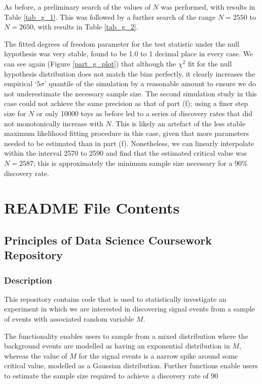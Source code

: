 \documentclass[12pt]{article}
\begin{document}
As before, a preliminary search of the values of $N$ was performed, with results in Table \ref{tab_g_1}.
This was followed by a further search of the range $N=2550$ to $N=2650$, with results in Table \ref{tab_g_2}.

The fitted degrees of freedom parameter for the test statistic under the null hypothesis was very stable, found to be 1.0 to 1 decimal place in every case.
We can see again (Figure \ref{part_g_plot}) that although the $\chi^2$ fit for the null hypothesis distribution does not match the bins perfectly, it clearly increases the empirical `$5\sigma$' quantile of the simulation by a reasonable amount to ensure we do not underestimate the necessary sample size.
The second simulation study in this case could not achieve the same precision as that of part (f); using a finer step size for $N$ or only 10000 toys as before led to a series of discovery rates that did not monotonically increase with $N$.
This is likely an artefact of the less stable maximum likelihood fitting procedure in this case, given that more parameters needed to be estimated than in part (f).
Nonetheless, we can linearly interpolate within the interval 2570 to 2590 and find that the estimated critical value was $N=2587$; this is approximately the minimum sample size necessary for a 90\% discovery rate.





\newpage

\appendix
\section*{README File Contents}

\subsection*{Principles of Data Science Coursework Repository}

\subsubsection*{Description}
This repository contains code that is used to statistically investigate an experiment in which we are interested in discovering signal events from a sample of events with associated random variable $M$.

The functionality enables users to sample from a mixed distribution where the background events are modelled as having an exponential distribution in $M$, whereas the value of $M$ for the signal events is a narrow spike around some critical value, modelled as a Gaussian distribution. Further functions enable users to estimate the sample size required to achieve a discovery rate of 90%
\end{document}
